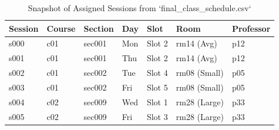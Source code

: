 \begin{table}[H]
  \centering
  \small
  \caption{Snapshot of Assigned Sessions from `final_class_schedule.csv`}
  \label{tab:schedule_snapshot}
  \begin{tabularx}{\linewidth}{C{1.8cm} C{1.8cm} C{1.8cm} C{2.0cm} C{1.8cm} C{2.0cm} C{2.0cm}}
    \toprule
    \color{PrismWhite}\textbf{Session} & 
    \color{PrismWhite}\textbf{Course} & 
    \color{PrismWhite}\textbf{Section} & 
    \color{PrismWhite}\textbf{Day} & 
    \color{PrismWhite}\textbf{Slot} & 
    \color{PrismWhite}\textbf{Room} & 
    \color{PrismWhite}\textbf{Professor} \\
    \midrule
    s000 & c01 & sec001 & Mon & Slot 2 & rm14 (Avg) & p12 \\
    s001 & c01 & sec001 & Thu & Slot 2 & rm14 (Avg) & p12 \\
    s002 & c01 & sec002 & Tue & Slot 4 & rm08 (Small) & p05 \\
    s003 & c01 & sec002 & Fri & Slot 5 & rm08 (Small) & p05 \\
    s004 & c02 & sec009 & Wed & Slot 1 & rm28 (Large) & p33 \\
    s005 & c02 & sec009 & Fri & Slot 3 & rm28 (Large) & p33 \\
    \bottomrule
  \end{tabularx}
\end{table}
